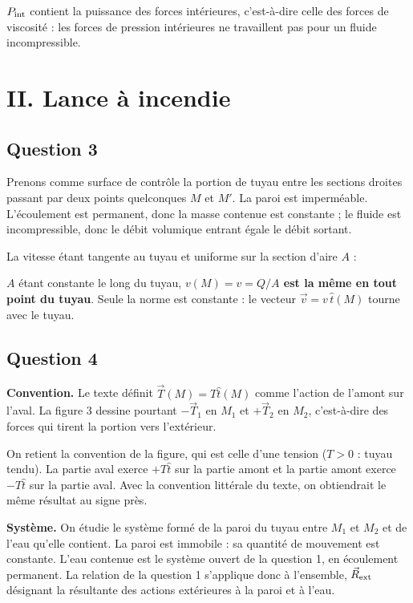 \documentclass[11pt,a4paper]{article}
\newcommand{\equationajustee}[1]{%
  \sbox{\boiteequation}{$\displaystyle #1$}%
  \ifdim\wd\boiteequation>\linewidth
    \[\resizebox{\linewidth}{!}{\usebox{\boiteequation}}\]%
  \else
    \[#1\]%
  \fi}
\begin{document}
\(P_{\rm int}\) contient la puissance des forces intérieures, c'est-à-dire celle des forces de viscosité : les forces de pression intérieures ne travaillent pas pour un fluide incompressible.

\hypertarget{ii.-lance-uxe0-incendie}{%
\section{II. Lance à incendie}\label{ii.-lance-uxe0-incendie}}

\hypertarget{question-3}{%
\subsection{Question 3}\label{question-3}}

Prenons comme surface de contrôle la portion de tuyau entre les sections droites passant par deux points quelconques \(M\) et \(M'\). La paroi est imperméable. L'écoulement est permanent, donc la masse contenue est constante ; le fluide est incompressible, donc le débit volumique entrant égale le débit sortant.

La vitesse étant tangente au tuyau et uniforme sur la section d'aire \(A\) :

\equationajustee{Q=v(M)\,A=v(M')\,A .}

\(A\) étant constante le long du tuyau, \textbf{\(v(M)=v=Q/A\) est la même en tout point du tuyau}. Seule la norme est constante : le vecteur \(\vec v=v\,\hat t(M)\) tourne avec le tuyau.

\hypertarget{question-4}{%
\subsection{Question 4}\label{question-4}}

\textbf{Convention.} Le texte définit \(\vec T(M)=T\hat t(M)\) comme l'action de l'amont sur l'aval. La figure 3 dessine pourtant \(-\vec T_1\) en \(M_1\) et \(+\vec T_2\) en \(M_2\), c'est-à-dire des forces qui tirent la portion vers l'extérieur.

On retient la convention de la figure, qui est celle d'une tension (\(T>0\) : tuyau tendu). La partie aval exerce \(+T\hat t\) sur la partie amont et la partie amont exerce \(-T\hat t\) sur la partie aval. Avec la convention littérale du texte, on obtiendrait le même résultat au signe près.

\textbf{Système.} On étudie le système formé de la paroi du tuyau entre \(M_1\) et \(M_2\) et de l'eau qu'elle contient. La paroi est immobile : sa quantité de mouvement est constante. L'eau contenue est le système ouvert de la question 1, en écoulement permanent. La relation de la question 1 s'applique donc à l'ensemble, \(\vec R_{\rm ext}\) désignant la résultante des actions extérieures à la paroi et à l'eau.
\end{document}
